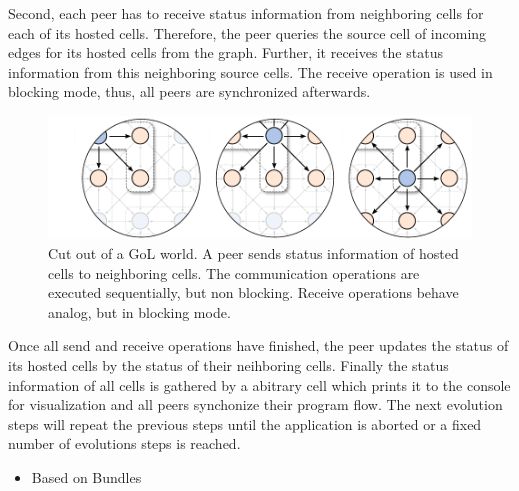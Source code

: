 Second, each peer has to receive status information from neighboring
cells for each of its hosted cells. Therefore, the peer queries the
source cell of incoming edges for its hosted cells from the
graph. Further, it receives the status information from this
neighboring source cells.  The receive operation is used in blocking
mode, thus, all peers are synchronized afterwards.


\begin{figure}[H]
  \centering
  \includegraphics[width=\textwidth]{graphics/40_gol_communication}
  \caption{Cut out of a GoL world. A peer sends status information of
    hosted cells to neighboring cells. The communication operations
    are executed sequentially, but non blocking. Receive operations
    behave analog, but in blocking mode.}
  \label{fig:gol_communication}
\end{figure}


Once all send and receive operations have finished, the peer updates
the status of its hosted cells by the status of their neihboring
cells. Finally the status information of all cells is gathered by a
abitrary cell which prints it to the console for visualization and all
peers synchonize their program flow.  The next evolution steps will
repeat the previous steps until the application is aborted or a fixed
number of evolutions steps is reached.

\begin{itemize}
\item Based on Bundles
\end{itemize}

